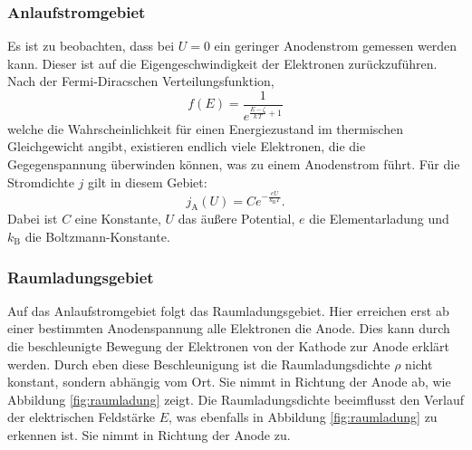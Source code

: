\subsubsection{Anlaufstromgebiet}
Es ist zu beobachten, dass bei $U=0$ ein geringer Anodenstrom gemessen werden kann. Dieser ist auf die Eigengeschwindigkeit der Elektronen zurückzuführen.
Nach der Fermi-Diracschen Verteilungsfunktion,
\begin{equation}
  f(E)=\frac{1}{e^{\frac{E-\zeta}{k\,T}+1}}
\end{equation}
welche die Wahrscheinlichkeit für einen Energiezustand im thermischen Gleichgewicht angibt, existieren endlich viele Elektronen, die die Gegegenspannung überwinden können, was zu einem Anodenstrom führt.
Für die Stromdichte $j$ gilt in diesem Gebiet:
\begin{equation}
  \label{eqn:anlauf}
  j_\mathrm{A}(U)=C e^{-\frac{e U}{k_\mathrm{B}T}}.
\end{equation}
Dabei ist $C$ eine Konstante, $U$ das äußere Potential, $e$ die Elementarladung und $k_\mathrm{B}$ die Boltzmann-Konstante.

\subsubsection{Raumladungsgebiet}
Auf das Anlaufstromgebiet folgt das Raumladungsgebiet. Hier erreichen erst ab einer bestimmten Anodenspannung alle Elektronen die Anode. Dies kann durch die beschleunigte Bewegung der Elektronen von der Kathode zur Anode erklärt werden. Durch eben diese Beschleunigung ist die Raumladungsdichte $\rho$ nicht konstant, sondern abhängig vom Ort. Sie nimmt in Richtung der Anode ab, wie Abbildung \ref{fig:raumladung} zeigt. Die Raumladungsdichte beeimflusst den Verlauf der elektrischen Feldstärke $E$, was ebenfalls in Abbildung \ref{fig:raumladung} zu erkennen ist. Sie nimmt in Richtung der Anode zu.

